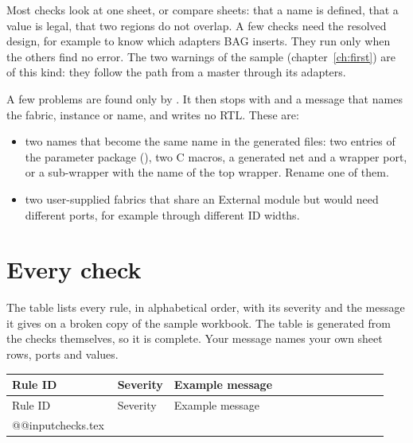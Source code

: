 Most checks look at one sheet, or compare sheets: that a name is defined, that a value
is legal, that two regions do not overlap. A few checks need the resolved design, for
example to know which adapters BAG inserts. They run only when the others find no error.
The two  warnings of the sample (chapter~\ref{ch:first}) are of
this kind: they follow
the path from a master through its adapters.

A few problems are found only by . It then stops with 
and a message that names the fabric, instance or name, and writes no RTL. These are:

\begin{itemize}
\item two names that become the same name in the generated files: two entries of the
  parameter package (), two C macros, a generated net and
  a wrapper port, or a sub-wrapper with the name of the top wrapper. Rename one of them.
\item two user-supplied fabrics that share an External module but would need different
  ports, for example through different ID widths.
\end{itemize}

\section{Every check}

The table lists every rule, in alphabetical order, with its severity and the message it
gives on a broken copy of the sample workbook. The table is generated from the checks
themselves, so it is complete. Your message names your own sheet rows, ports and values.

\begingroup
\footnotesize
\begin{longtable}{@{}>{\raggedright}p{0.28\linewidth}>{\raggedright}p{0.08\linewidth}p{0.58\linewidth}@{}}
\toprule
Rule ID & Severity & Example message \tabularnewline
\midrule
\endfirsthead
\toprule
Rule ID & Severity & Example message \tabularnewline
\midrule
\endhead
\csname @@input\endcsname checks.tex
\bottomrule
\end{longtable}
\endgroup
